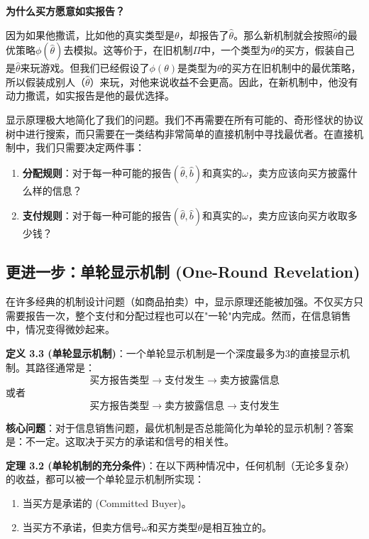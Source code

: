 \textbf{为什么买方愿意如实报告？}

因为如果他撒谎，比如他的真实类型是$\theta$，却报告了$\hat{\theta}$。那么新机制就会按照$\hat{\theta}$的最优策略$\phi(\hat{\theta})$去模拟。这等价于，在旧机制$\Pi$中，一个类型为$\theta$的买方，假装自己是$\hat{\theta}$来玩游戏。但我们已经假设了$\phi(\theta)$是类型为$\theta$的买方在旧机制中的最优策略，所以假装成别人（$\hat{\theta}$）来玩，对他来说收益不会更高。因此，在新机制中，他没有动力撒谎，如实报告是他的最优选择。

显示原理极大地简化了我们的问题。我们不再需要在所有可能的、奇形怪状的协议树中进行搜索，而只需要在一类结构非常简单的直接机制中寻找最优者。在直接机制中，我们只需要决定两件事：
\begin{enumerate}
    \item \textbf{分配规则}：对于每一种可能的报告$(\hat{\theta},\hat{b})$和真实的$\omega$，卖方应该向买方披露什么样的信息？
    \item \textbf{支付规则}：对于每一种可能的报告$(\hat{\theta},\hat{b})$和真实的$\omega$，卖方应该向买方收取多少钱？
\end{enumerate}

\subsection{更进一步：单轮显示机制 (One-Round Revelation)}

在许多经典的机制设计问题（如商品拍卖）中，显示原理还能被加强。不仅买方只需要报告一次，整个支付和分配过程也可以在"一轮"内完成。然而，在信息销售中，情况变得微妙起来。

\textbf{定义 3.3 (单轮显示机制)}：一个单轮显示机制是一个深度最多为3的直接显示机制。其路径通常是：
$$\text{买方报告类型}\to\text{支付发生}\to\text{卖方披露信息}$$
或者
$$\text{买方报告类型}\to\text{卖方披露信息}\to\text{支付发生}$$

\textbf{核心问题}：对于信息销售问题，最优机制是否总能简化为单轮的显示机制？答案是：不一定。这取决于买方的承诺和信号的相关性。

\textbf{定理 3.2 (单轮机制的充分条件)}：在以下两种情况中，任何机制（无论多复杂）的收益，都可以被一个单轮显示机制所实现：
\begin{enumerate}
    \item 当买方是承诺的 (Committed Buyer)。
    \item 当买方不承诺，但卖方信号$\omega$和买方类型$\theta$是相互独立的。
\end{enumerate}

